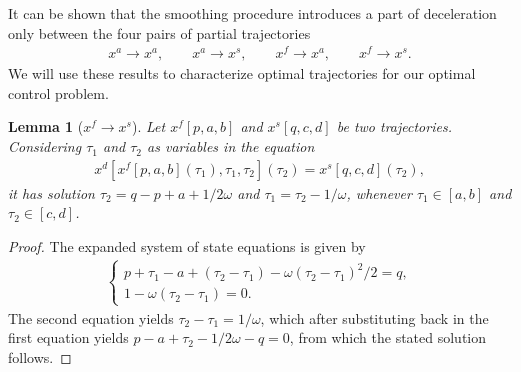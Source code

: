 \documentclass[a4paper]{report}
\theoremstyle{definition}
\theoremstyle{plain}
\newtheorem{lemma}{Lemma}[chapter]
\begin{document}
It can be shown that the smoothing procedure introduces a part of deceleration
only between the four pairs of partial trajectories
\begin{align*}
    x^{a} \rightarrow x^{a} , \quad \quad
    x^{a} \rightarrow x^{s} , \quad \quad
    x^{f} \rightarrow x^{a} , \quad \quad
    x^{f} \rightarrow x^{s} .
\end{align*}
We will use these results to characterize optimal trajectories for our optimal
control problem.

\begin{lemma}[$x^{f} \rightarrow x^{s}$]
  Let $x^{f}[p, a, b]$ and $x^{s}[q, c, d]$ be two trajectories. Considering
  $\tau_{1}$ and $\tau_{2}$ as variables in the equation
  \begin{align*}
    x^{d}[x^{f}[p, a, b](\tau_{1}), \tau_{1}, \tau_{2}](\tau_{2}) = x^{s}[q, c, d](\tau_{2}) ,
  \end{align*}
  it has solution
  $\tau_{2} = q - p + a + 1/2\omega$ and $\tau_{1} = \tau_{2} - 1/\omega$, whenever
  $\tau_{1} \in [a, b]$ and $\tau_{2} \in [c, d]$.
\end{lemma}
\begin{proof}
  The expanded system of state equations is given by
  \begin{align*}
    \begin{cases}
      p + \tau_{1} - a + (\tau_{2} - \tau_{1}) - \omega(\tau_{2} - \tau_{1})^{2} / 2 = q , \\
      1 - \omega(\tau_{2} - \tau_{1}) = 0 .
    \end{cases}
  \end{align*}
  The second equation yields $\tau_{2} - \tau_{1} = 1/\omega$, which after
  substituting back in the first equation yields
  $p - a + \tau_{2} - 1/2\omega - q = 0$, from which the stated solution
  follows.
\end{proof}
\end{document}

